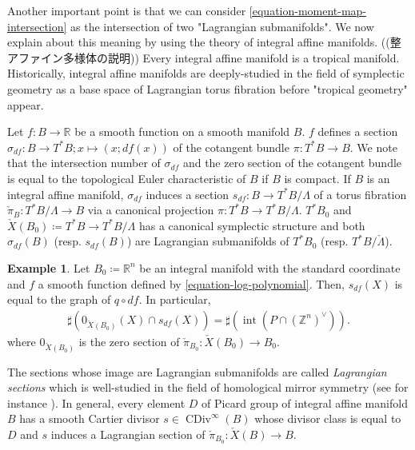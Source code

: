 \documentclass[a4paper,dvipdfmx,reqno,12pt]{amsart}
\theoremstyle{definition}
\newtheorem{example}[theorem]{Example}
\newcommand{\deq}{\coloneqq}
\newcommand{\opn}[1]{\operatorname{#1}}
\numberwithin{equation}{section}
\begin{document}


Another important point is that 
we can consider \cref{equation-moment-map-intersection}
as the intersection of two "Lagrangian submanifolds".
We now explain about this meaning by
using the theory of integral affine manifolds.
((整アファイン多様体の説明))
Every integral affine manifold is a tropical manifold.
Historically, integral affine manifolds are 
deeply-studied in the field of symplectic geometry 
as a base space of Lagrangian torus fibration before
"tropical geometry" appear.

Let $f\colon B\to \mathbb{R}$ be a 
smooth function on a smooth manifold $B$.
$f$ defines a section 
$\sigma_{df}\colon B\to T^{*}B; x\mapsto (x;df(x))$ of 
the cotangent bundle $\pi\colon T^{*}B\to B$.
We note that the intersection number of 
$\sigma_{df}$ and the zero section of the cotangent
bundle is equal to the topological Euler characteristic
of $B$ if $B$ is compact.
If $B$ is an integral affine manifold,
$\sigma_{df}$ induces a section 
$s_{df}\colon B\to T^*B/\Lambda$ of a torus fibration
$\check{\pi}_B\colon T^*B/\Lambda \to B$ via a canonical 
projection $\pi \colon T^*B\to T^*B/\Lambda$.
$T^{*}B_0$ and $\check{X}(B_0)\deq T^*B\to T^*B/\Lambda$
has a canonical symplectic structure and
both $\sigma_{df}(B)$ (resp. $s_{df}(B)$) are Lagrangian 
submanifolds of $T^{*}B_0$ 
(resp. $T^*B/\check{\Lambda}$).

\begin{example}
Let $B_0\deq\mathbb{R}^{n}$ be 
an integral manifold with the standard coordinate and
$f$ a smooth function defined by
\cref{equation-log-polynomial}.
Then, $s_{df}(X)$ is equal to the graph of 
$q\circ df$. In particular,
\begin{align}
\sharp (0_{\check{X}(B_0)}(X)\cap s_{df}(X))=
\sharp (\opn{int}(P\cap (\mathbb{Z}^{n})^{\vee})).
\end{align}
where $0_{\check{X}(B_0)}$ is the 
zero section of 
$\check{\pi}_{B_0}\colon\check{X}(B_0)\to B_0$.
\end{example}

The sections whose image are Lagrangian
submanifolds are called
\emph{Lagrangian sections}
which is well-studied in the field of homological 
mirror symmetry 
(see for instance \cite{MR1882331}).
In general, every element $D$ of Picard group of 
integral affine manifold $B$ has a smooth Cartier
divisor $s\in \opn{CDiv}^{\infty}(B)$ whose divisor 
class is equal to $D$ and 
$s$ induces a Lagrangian section of 
$\check{\pi}_{B_0}\colon \check{X}(B)\to B$.
\end{document}
